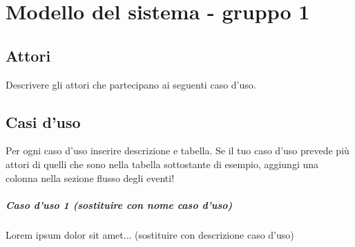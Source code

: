 
\chapter{Modello del sistema - gruppo 1}
\label{ref:modSistemaGruppo1}


\section{Attori}
Descrivere gli attori che partecipano ai seguenti caso d'uso.

\section{Casi d'uso}
Per ogni caso d'uso inserire descrizione e tabella. Se il tuo caso d'uso prevede più attori di quelli che sono nella tabella sottostante di esempio, aggiungi una colonna nella sezione flusso degli eventi!

\paragraph{Caso d'uso 1 (sostituire con nome caso d'uso) \\} 
Lorem ipsum dolor sit amet... (sostituire con descrizione caso d'uso)

